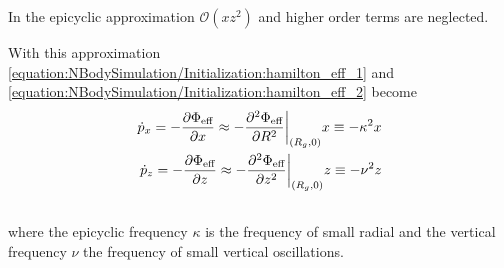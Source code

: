 \documentclass[letterpaper,10pt,english]{sphinxmanual}
\begin{document}
\sphinxAtStartPar
In the epicyclic approximation \(\mathcal{O}(xz^2)\) and higher order terms are neglected.

\sphinxAtStartPar
With this approximation \eqref{equation:NBodySimulation/Initialization:hamilton_eff_1} and \eqref{equation:NBodySimulation/Initialization:hamilton_eff_2} become
\begin{align}\label{equation:NBodySimulation/Initialization:hamilton_eff_approx}\!\begin{aligned}
\dot{p}_{x} = -\frac{\partial \Phi_{\textup{eff}} }{\partial x} \approx
 -\frac{\partial^2 \Phi_{\textup{eff}} }{\partial R^2}\bigg|_{(R_g,0)}x \equiv
 -\kappa^2x\\
\dot{p}_{z} = -\frac{\partial \Phi_{\textup{eff}} }{\partial z} \approx
 -\frac{\partial^2 \Phi_{\textup{eff}} }{\partial z^2}\bigg|_{(R_g,0)}z \equiv
 -\nu^2z   \\\\
\end{aligned}\end{align}
\sphinxAtStartPar
where the epicyclic frequency \(\kappa\) is the frequency of small radial and the vertical frequency \(\nu\) the frequency of small vertical oscillations.
\end{document}
